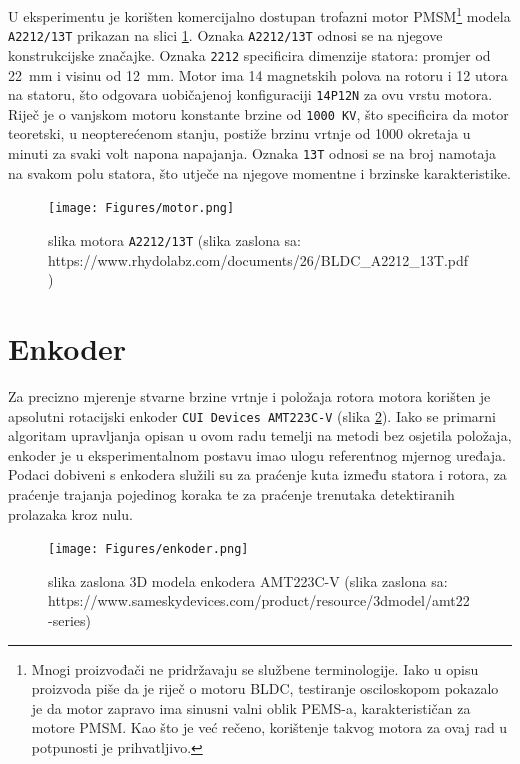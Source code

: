 \documentclass[diplomskirad, upload]{fer}
\begin{document}
U eksperimentu je korišten komercijalno dostupan trofazni motor
PMSM\footnote{Mnogi proizvođači ne pridržavaju se službene terminologije. Iako
	u opisu proizvoda piše da je riječ o motoru BLDC, testiranje osciloskopom
	pokazalo je da motor zapravo ima sinusni valni oblik PEMS-a, karakterističan za
	motore PMSM. Kao što je već rečeno, korištenje takvog motora za ovaj rad u
	potpunosti je prihvatljivo.} modela \texttt{A2212/13T} prikazan na slici
\ref{fig:motor}. Oznaka \texttt{A2212/13T} odnosi se na njegove konstrukcijske
značajke. Oznaka \texttt{2212} specificira dimenzije statora: promjer od
\SI{22}{\milli\metre} i visinu od \SI{12}{\milli\metre}. Motor ima 14
magnetskih polova na rotoru i 12 utora na statoru, što odgovara uobičajenoj
konfiguraciji \texttt{14P12N} za ovu vrstu motora. Riječ je o vanjskom motoru
konstante brzine od \texttt{1000 KV}, što specificira da motor teoretski, u
neopterećenom stanju, postiže brzinu vrtnje od \num{1000} okretaja u minuti za
svaki volt napona napajanja. Oznaka \texttt{13T} odnosi se na broj namotaja na
svakom polu statora, što utječe na njegove momentne i brzinske karakteristike.
\begin{figure}[h!]
	\centering
	\texttt{[image: Figures/motor.png]}
	\caption{slika motora \texttt{A2212/13T} (slika zaslona sa: https://www.rhydolabz.com/documents/26/BLDC\_A2212\_13T.pdf)}
	\label{fig:motor}
\end{figure}

\section{Enkoder}
\label{sec:enkoder}

Za precizno mjerenje stvarne brzine vrtnje i položaja rotora motora korišten je
apsolutni rotacijski enkoder \texttt{CUI Devices AMT223C-V} (slika
\ref{fig:enkoder}). Iako se primarni algoritam upravljanja opisan u ovom radu
temelji na metodi bez osjetila položaja, enkoder je u eksperimentalnom postavu
imao ulogu referentnog mjernog uređaja. Podaci dobiveni s enkodera služili su
za praćenje kuta između statora i rotora, za praćenje trajanja pojedinog koraka
te za praćenje trenutaka detektiranih prolazaka kroz nulu.

\begin{figure}[h!]
	\centering
	\texttt{[image: Figures/enkoder.png]}
	\caption{slika zaslona 3D modela enkodera AMT223C-V (slika zaslona sa: https://www.sameskydevices.com/product/resource/3dmodel/amt22-series)}
	\label{fig:enkoder}
\end{figure}
\end{document}
